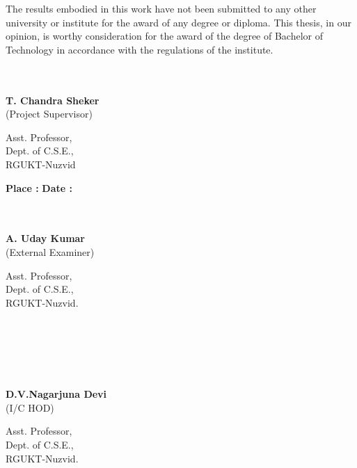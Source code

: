 \documentclass[12pt]{report}
\begin{document}
The results embodied in this work have not been submitted to any other university or institute for the award of any degree or diploma. This thesis, in our opinion, is worthy consideration for the award of the degree of Bachelor of Technology in accordance with the regulations of the institute.\\
\hfill\break
\hfill\break
\hfill\break
\hfill\break
\hfill\break
\hfill\break
\hfill\break


\begin{minipage}[t]{7cm}
\begin{flushleft}
\underline{\hspace{6cm}}\\
\underline{} \\
\textbf{T. Chandra Sheker}\\
(Project Supervisor)\\
\begin{small}
Asst. Professor,\\
Dept. of C.S.E.,\\
RGUKT-Nuzvid\\
\end{small}
\hfill\break
\hfill\break
\hfill\break
\hfill\break
\hfill\break
\hfill\break
\vfill
\textbf{Place :} \underline{\hspace{5cm}}
\textbf{Date :} \underline{\hspace{5cm}}
\vfill
\end{flushleft}
\end{minipage}
\hfill
\begin{minipage}[t]{7cm}
\begin{flushright}
\underline{\hspace{6cm}}\\
\underline{} \\
\textbf{A. Uday Kumar}\\
(External Examiner)\\
\begin{small}
Asst. Professor,\\
Dept. of C.S.E.,\\
RGUKT-Nuzvid.\\
\end{small}

\underline{} \\
\underline{} \\
\underline{} \\
\underline{\hspace{6cm}}\\
\underline{} \\
\textbf{D.V.Nagarjuna Devi}\\
(I/C HOD)\\
\begin{small}
Asst. Professor,\\
Dept. of C.S.E.,\\
RGUKT-Nuzvid.\\

\end{small}



\end{flushright}


\end{minipage}
\end{document}
